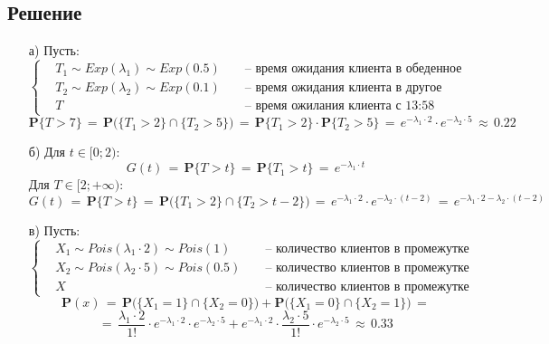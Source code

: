 \documentclass{article}
\begin{document}
\subsection*{Решение}
\begin{enumerate}
\item[а)] Пусть:
\begin{equation*}
\left\{
\begin{aligned}
& T_1 \! \sim \! Exp(\lambda_1) \! \sim \! Exp(0.5) & & \text{ -- время ожидания клиента в обеденное время} \\
& T_2 \! \sim \! Exp(\lambda_2) \! \sim \! Exp(0.1) & & \text{ -- время ожидания клиента в другое время время} \\
& T & & \text{ -- время ожилания клиента с 13:58}
\end{aligned}
\right.
\end{equation*}
\[ \mathbf{P} \big\{ T \! > 7 \big\} \, = \, \mathbf{P} \bigg( \big\{ T_1 \! > \! 2 \big\} \cap \big\{ T_2 \! > \! 5 \big\} \bigg) \, = \, \mathbf{P} \big\{ T_1 \! > \! 2 \big\} \! \cdot \! \mathbf{P} \big\{ T_2 \! > \! 5 \big\} \, = \, e^{-\lambda_1 \cdot 2} \! \cdot \! e^{-\lambda_2 \cdot 5} \, \approx \, 0.22 \]
\item[б)]
Для $ t \! \in \! [0;2) $:
\[ G(t) \, = \, \mathbf{P} \big\{ T \! > \! t \big\} \, = \, \mathbf{P} \big\{ T_1 \! > \! t \big\} \, = \, e^{-\lambda_1 \cdot t} \]
Для $ T \! \in \! [2;+\infty ) $:
\[ G(t) \, = \, \mathbf{P} \big\{ T \! > \! t \big\} \, = \, \mathbf{P} \bigg( \big\{ T_1 \! > \! 2 \big\} \cap \big\{ T_2 \! > \! t \! - \! 2 \big\} \bigg) \, = \, e^{-\lambda_1 \cdot 2} \! \cdot \! e^{-\lambda_2 \cdot (t-2)} \, = \, e^{-\lambda_1 \cdot 2 - \lambda_2 \cdot (t-2)} \]
\item[в)] Пусть:
\begin{equation*}
\left\{
\begin{aligned}
& X_1 \! \sim \! Pois(\lambda_1 \! \cdot \! 2) \! \sim \! Pois(1) & & \text{ -- количество клиентов в промежутке (13:58-14:00)} \\
& X_2 \! \sim \! Pois(\lambda_2 \! \cdot \! 5) \! \sim \! Pois(0.5) & & \text{ -- количество клиентов в промежутке (14:00-14:05)} \\
& X & & \text{ -- количество клиентов в промежутке (13:58-14:05)}
\end{aligned}
\right.
\end{equation*}
\[ \mathbf{P}(x) \, = \, \mathbf{P} \bigg( \big\{ X_1 \! = \! 1 \big\} \cap \big\{ X_2 \! = \! 0 \big\} \bigg) \! + \! \mathbf{P} \bigg( \big\{ X_1 \! = \! 0 \big\} \cap \big\{ X_2 \! = \! 1 \big\} \bigg) \, = \]
\[ =\, \dfrac{\lambda_1 \cdot \! 2}{1!} \! \cdot \! e^{-\lambda_1 \cdot 2} \! \cdot \! e^{-\lambda_2 \cdot 5} \! + \! e^{-\lambda_1 \cdot 2} \! \cdot \! \dfrac{\lambda_2 \! \cdot \! 5}{1!} \! \cdot \! e^{-\lambda_2 \cdot 5} \, \approx \, 0.33 \]
\end{enumerate}
\end{document}
